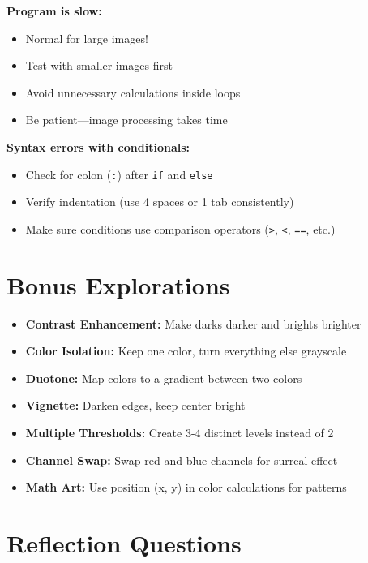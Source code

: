 \documentclass[11pt]{article}
\begin{document}
\textbf{Program is slow:}
\begin{itemize}
    \item Normal for large images!
    \item Test with smaller images first
    \item Avoid unnecessary calculations inside loops
    \item Be patient—image processing takes time
\end{itemize}

\textbf{Syntax errors with conditionals:}
\begin{itemize}
    \item Check for colon (\texttt{:}) after \texttt{if} and \texttt{else}
    \item Verify indentation (use 4 spaces or 1 tab consistently)
    \item Make sure conditions use comparison operators (\texttt{>}, \texttt{<}, \texttt{==}, etc.)
\end{itemize}

\section*{Bonus Explorations}

\begin{itemize}
    \item \textbf{Contrast Enhancement:} Make darks darker and brights brighter
    \item \textbf{Color Isolation:} Keep one color, turn everything else grayscale
    \item \textbf{Duotone:} Map colors to a gradient between two colors
    \item \textbf{Vignette:} Darken edges, keep center bright
    \item \textbf{Multiple Thresholds:} Create 3-4 distinct levels instead of 2
    \item \textbf{Channel Swap:} Swap red and blue channels for surreal effect
    \item \textbf{Math Art:} Use position (x, y) in color calculations for patterns
\end{itemize}

\section*{Reflection Questions}
\end{document}

